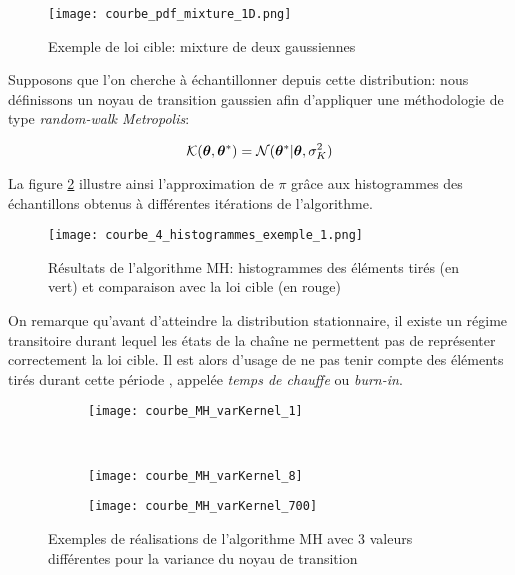 \begin{figure}[h!]
	\centering
	\texttt{[image: courbe\_pdf\_mixture\_1D.png]}
	\caption{Exemple de loi cible: mixture de deux gaussiennes}
	\label{fig_courbe_pdf_mixture_1D}
\end{figure}


 Supposons que l'on cherche à échantillonner depuis cette distribution: nous définissons un noyau de transition  gaussien afin d'appliquer une méthodologie de type \textit{random-walk Metropolis}: 

\begin{equation}
	{\mathcal{K}}({\bm{\theta}}, {{\bm{\theta}}^*} ) = \mathcal{N}({{\bm{\theta}}^*} | {\bm{\theta}}, \sigma_{K}^2)
	\label{eq_noyau_gaussien}
\end{equation}

La figure \ref{fig_courbe_4_histogrammes_exemple_1} illustre ainsi l'approximation de $\pi$ grâce aux histogrammes des {échantillons} obtenus à différentes itérations de l'algorithme. 

\begin{figure}[h!]
	\centering
	\texttt{[image: courbe\_4\_histogrammes\_exemple\_1.png]}
	\caption{Résultats de l'algorithme MH: histogrammes des éléments tirés (en vert) et comparaison avec la loi cible (en rouge)}
	\label{fig_courbe_4_histogrammes_exemple_1}
\end{figure}

On remarque qu'avant d'atteindre la distribution stationnaire, il existe un régime transitoire durant lequel les états de la chaîne ne permettent pas de représenter correctement la loi cible. Il est alors d'usage de ne pas tenir compte des éléments tirés durant cette période , appelée \textit{temps de chauffe} ou \textit{burn-in}. \\


\begin{figure}[h!]
	\centering
	\begin{subfigure}[t]{0.5\textwidth}
		\centering
		\texttt{[image: courbe\_MH\_varKernel\_1]}
		\caption{}
		\label{subfig_varK_1}
	\end{subfigure}%
	~ 
	\begin{subfigure}[t]{0.5\textwidth}
		\centering
		\texttt{[image: courbe\_MH\_varKernel\_8]}
		\caption{}
		\label{subfig_varK_8}
	\end{subfigure}
	\begin{subfigure}{0.5\textwidth}
		\centering
		\texttt{[image: courbe\_MH\_varKernel\_700]}
		\caption{}
		\label{subfig_varK_700}
	\end{subfigure}
	
	\caption{Exemples de réalisations de l'algorithme MH avec 3 valeurs différentes pour la variance du noyau de transition}
\end{figure}

